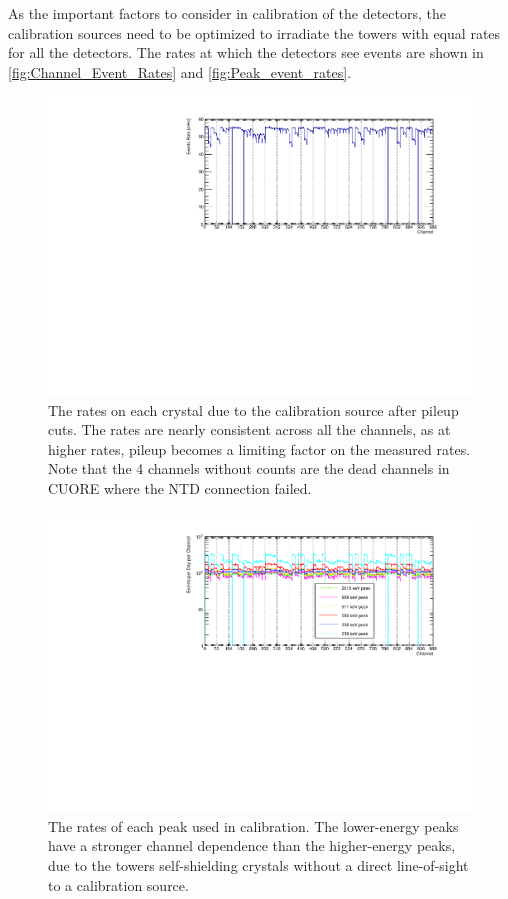 As the important factors to consider in calibration of the detectors, the calibration sources need to be optimized to irradiate the towers with equal rates for all the detectors.
The rates at which the detectors see events are shown in \autoref{fig:Channel_Event_Rates} and \autoref{fig:Peak_event_rates}.
\begin{figure}
    \centering
    \includegraphics[width=0.9\linewidth]{Figures/ChannelEventRates.pdf}
    \caption[The rates on each crystal due to the calibration source after pileup cuts]
    {The rates on each crystal due to the calibration source after pileup cuts.
    The rates are nearly consistent across all the channels, as at higher rates, pileup becomes a limiting factor on the measured rates.
    Note that the 4 channels without counts are the dead channels in CUORE where the NTD connection failed.}
    \label{fig:Channel_Event_Rates}
\end{figure}
\begin{figure}
    \centering
    \includegraphics[width=0.9\linewidth]{Figures/PeakEventRates.pdf}
    \caption[The rates of each peak used in calibration]
    {The rates of each peak used in calibration.
    The lower-energy peaks have a stronger channel dependence than the higher-energy peaks, due to the towers self-shielding crystals without a direct line-of-sight to a calibration source.}
    \label{fig:Peak_event_rates}
\end{figure}
